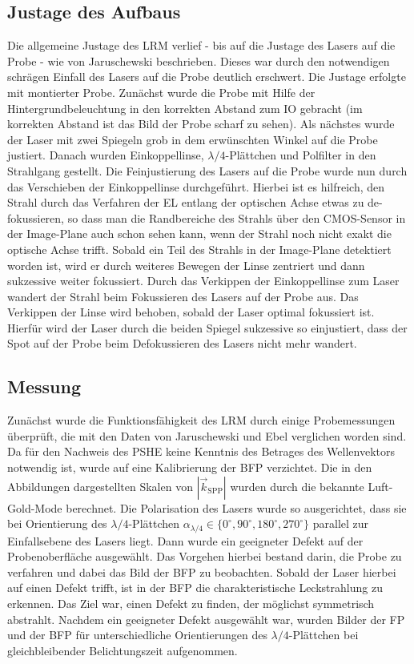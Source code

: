 \documentclass[titlepage]{article}
\begin{document}
	\subsection{Justage des Aufbaus}
	Die allgemeine Justage des LRM verlief - bis auf die Justage des Lasers auf die Probe - wie von Jaruschewski \cite{Jaruschewski.2020} beschrieben. Dieses war durch den notwendigen schrägen Einfall des Lasers auf die Probe deutlich erschwert. Die Justage erfolgte mit montierter Probe. Zunächst wurde die Probe mit Hilfe der Hintergrundbeleuchtung in den korrekten Abstand zum IO gebracht (im korrekten Abstand ist das Bild der Probe scharf zu sehen). Als nächstes wurde der Laser mit zwei Spiegeln grob in dem erwünschten Winkel auf die Probe justiert. Danach wurden Einkoppellinse, $\lambda/4$-Plättchen und Polfilter in den Strahlgang gestellt. Die Feinjustierung des Lasers auf die Probe wurde nun durch das Verschieben der Einkoppellinse durchgeführt. Hierbei ist es hilfreich, den Strahl durch das Verfahren der EL entlang der optischen Achse etwas zu de-fokussieren, so dass man die Randbereiche des Strahls über den CMOS-Sensor in der Image-Plane auch schon sehen kann, wenn der Strahl noch nicht exakt die optische Achse trifft. Sobald ein Teil des Strahls in der Image-Plane detektiert worden ist, wird er durch weiteres Bewegen der Linse zentriert und dann sukzessive weiter fokussiert. Durch das Verkippen der Einkoppellinse zum Laser wandert der Strahl beim Fokussieren des Lasers auf der Probe aus. Das Verkippen der Linse wird behoben, sobald der Laser optimal fokussiert ist. Hierfür wird der Laser durch die beiden Spiegel sukzessive so einjustiert, dass der Spot auf der Probe beim Defokussieren des Lasers nicht mehr wandert. 
	\subsection{Messung}
	Zunächst wurde die Funktionsfähigkeit des LRM durch einige Probemessungen überprüft, die mit den Daten von Jaruschewski \cite{Jaruschewski.2020} und Ebel \cite{ebel.2019} verglichen worden sind. Da für den Nachweis des PSHE keine Kenntnis des Betrages des Wellenvektors notwendig ist, wurde auf eine Kalibrierung der BFP verzichtet. Die in den Abbildungen dargestellten Skalen von $|\vec{k}_{\mathrm{SPP}}|$ wurden durch die bekannte Luft-Gold-Mode berechnet. Die Polarisation des Lasers wurde so ausgerichtet, dass sie bei Orientierung des $\lambda/4$-Plättchen $\alpha_{\lambda/4} \in \{0^\circ, 90^\circ, 180^\circ, 270^\circ\}$ parallel zur Einfallsebene des Lasers liegt.  Dann wurde ein geeigneter Defekt auf der Probenoberfläche ausgewählt. Das Vorgehen hierbei bestand darin, die Probe zu verfahren und dabei das Bild der BFP zu beobachten. Sobald der Laser hierbei auf einen Defekt trifft, ist in der BFP die charakteristische Leckstrahlung zu erkennen. Das Ziel war, einen Defekt zu finden, der möglichst symmetrisch abstrahlt. Nachdem ein geeigneter Defekt ausgewählt war, wurden Bilder der FP und der BFP für unterschiedliche Orientierungen des $\lambda/4$-Plättchen bei gleichbleibender Belichtungszeit aufgenommen.
	
\end{document}
